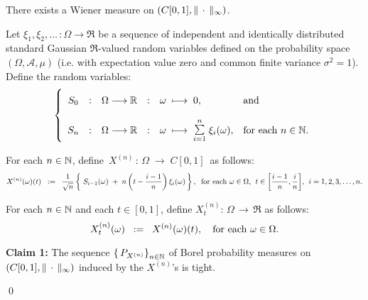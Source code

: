 \begin{theorem}
\label{WienerMeasureExistence}
\mbox{}\vskip 0.2cm
\noindent
There exists a Wiener measure on $\left(C[0,1],\Vert\,\cdot\,\Vert_{\infty}\right)$.
\end{theorem}
\proof
Let $\xi_{1}, \xi_{2}, \ldots\, : \Omega \longrightarrow \Re$ be a sequence of
independent and identically distributed standard Gaussian $\Re$-valued
random variables defined on the probability space $(\Omega,\mathcal{A},\mu)$
(i.e. with expectation value zero and common finite variance $\sigma^{2} = 1$).
Define the random variables:
\begin{equation*}
	\left\{\begin{array}{ccccll}
	S_{0}
	&:&\overset{{\color{white}1}}{\Omega} \longrightarrow \Re
	&:& \omega \;\longmapsto\; 0,
	& \textnormal{and}
	\\ \\
	S_{n}
	&:&	\Omega \longrightarrow \Re
	&:&	\omega \;\longmapsto\; \overset{n}{\underset{i=1}{\textnormal{\Large$\sum$}}}\;\xi_{i}(\omega),
	& \textnormal{for each $n \in \N$}.
	\end{array}\right.
\end{equation*}

\vskip 0.2cm
\noindent
For each $n \in \mathbb{N}$, define \,$X^{(n)} \,:\, \Omega \;\longrightarrow\;C[0,1]$\, as follows:
\begin{equation*}
	X^{(n)}(\omega)(t)
	\;\; := \;\;
	\dfrac{1}{\sqrt{n}}
	\left\{\;
	S_{i-1}(\omega) \;+\; n\left(t - \dfrac{i-1}{n}\right)\xi_{i}(\omega)
	\,\right\},
	\;\;
	\textnormal{for each $\omega \in \Omega$, \;$t \in \left[\frac{i-1}{n},\frac{i}{n}\right]$, \;$i = 1,2,3,\ldots,n$}.
\end{equation*}

\vskip 0.2cm
\noindent
For each $n \in \mathbb{N}$ and each $t \in [0,1]$, define
\;$X^{(n)}_{t} : \,\Omega \, \longrightarrow \, \Re$\;
as follows:
\begin{equation*}
	X^{(n)}_{t}(\omega) \;\; := \;\; X^{(n)}(\omega)(t),
	\quad
	\textnormal{for each $\omega \in \Omega$}.
\end{equation*}

\begin{center}
\begin{minipage}{6.5in}
\noindent
\textbf{Claim 1:}
\vskip 0.1cm
\noindent
The sequence $\left\{\,P_{X^{(n)}}\right\}_{n\in\mathbb{N}}$ of Borel probability measures on
$\left(C[0,1],\Vert\,\cdot\,\Vert_{\infty}\right)$ induced by the $X^{(n)}$'s is tight.
\end{minipage}
\end{center}

\qed

